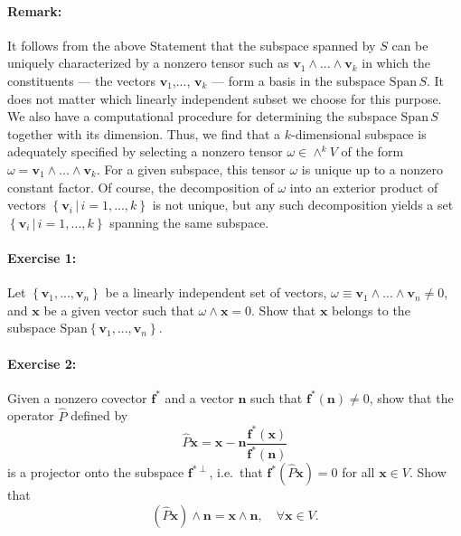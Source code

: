 \paragraph{Remark:}

It follows from the above Statement that the subspace spanned by $S$
can be uniquely characterized by a nonzero tensor such as $\mathbf{v}_{1}\wedge...\wedge\mathbf{v}_{k}$
in which the constituents --- the vectors $\mathbf{v}_{1}$,..., $\mathbf{v}_{k}$
--- form a basis in the subspace $\text{Span}\, S$. It does not matter
which linearly independent subset we choose for this purpose. We also
have a computational procedure for determining the subspace $\text{Span}\, S$
together with its dimension. Thus, we find that a $k$-dimen\-sion\-al
subspace is adequately specified by selecting a nonzero tensor $\omega\in\wedge^{k}V$
of the form $\omega=\mathbf{v}_{1}\wedge...\wedge\mathbf{v}_{k}$.
For a given subspace, this tensor $\omega$ is unique up to a nonzero
constant factor. Of course, the decomposition of $\omega$ into an
exterior product of vectors $\left\{ \mathbf{v}_{i}\,|\, i=1,...,k\right\} $
is not unique, but any such decomposition yields a set $\left\{ \mathbf{v}_{i}\,|\, i=1,...,k\right\} $
spanning the same subspace. 


\paragraph{Exercise 1:}

Let $\left\{ \mathbf{v}_{1},...,\mathbf{v}_{n}\right\} $ be a linearly
independent set of vectors, $\omega\equiv\mathbf{v}_{1}\wedge...\wedge\mathbf{v}_{n}\neq0$,
and $\mathbf{x}$ be a given vector such that $\omega\wedge\mathbf{x}=0$.
Show that $\mathbf{x}$ belongs to the subspace $\text{Span}\left\{ \mathbf{v}_{1},...,\mathbf{v}_{n}\right\} $. 


\paragraph{Exercise 2:}

Given a nonzero covector $\mathbf{f}^{*}$ and a vector $\mathbf{n}$
such that $\mathbf{f}^{*}(\mathbf{n})\neq0$, show that the operator
$\hat{P}$ defined by\[
\hat{P}\mathbf{x}=\mathbf{x}-\mathbf{n}\frac{\mathbf{f}^{*}(\mathbf{x})}{\mathbf{f}^{*}(\mathbf{n})}\]
 is a projector onto the subspace $\mathbf{f}^{*\perp}$,
i.e.~that $\mathbf{f}^{*}(\hat{P}\mathbf{x})=0$ for all $\mathbf{x}\in V$.
Show that\[
(\hat{P}\mathbf{x})\wedge\mathbf{n}=\mathbf{x}\wedge\mathbf{n},\quad\forall\mathbf{x}\in V.\]



